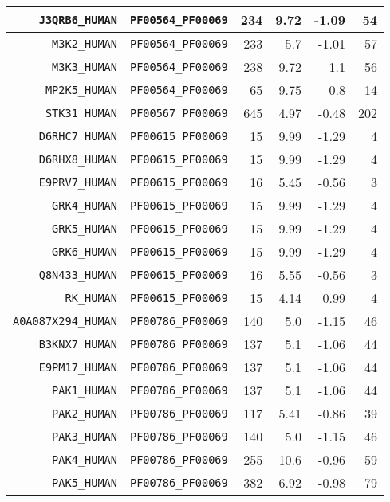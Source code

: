 \begin{longtable}[c]{||r|r|r|r|r|r||}
  \hline
  \texttt{J3QRB6\_HUMAN} & \texttt{PF00564\_PF00069} & 234 & 9.72 & -1.09 & 54 \\
  \hline
  \texttt{M3K2\_HUMAN} & \texttt{PF00564\_PF00069} & 233 & 5.7 & -1.01 & 57 \\
  \hline
  \texttt{M3K3\_HUMAN} & \texttt{PF00564\_PF00069} & 238 & 9.72 & -1.1 & 56 \\
  \hline
  \texttt{MP2K5\_HUMAN} & \texttt{PF00564\_PF00069} & 65 & 9.75 & -0.8 & 14 \\
  \hline
  \texttt{STK31\_HUMAN} & \texttt{PF00567\_PF00069} & 645 & 4.97 & -0.48 & 202 \\
  \hline
  \texttt{D6RHC7\_HUMAN} & \texttt{PF00615\_PF00069} & 15 & 9.99 & -1.29 & 4 \\
  \hline
  \texttt{D6RHX8\_HUMAN} & \texttt{PF00615\_PF00069} & 15 & 9.99 & -1.29 & 4 \\
  \hline
  \texttt{E9PRV7\_HUMAN} & \texttt{PF00615\_PF00069} & 16 & 5.45 & -0.56 & 3 \\
  \hline
  \texttt{GRK4\_HUMAN} & \texttt{PF00615\_PF00069} & 15 & 9.99 & -1.29 & 4 \\
  \hline
  \texttt{GRK5\_HUMAN} & \texttt{PF00615\_PF00069} & 15 & 9.99 & -1.29 & 4 \\
  \hline
  \texttt{GRK6\_HUMAN} & \texttt{PF00615\_PF00069} & 15 & 9.99 & -1.29 & 4 \\
  \hline
  \texttt{Q8N433\_HUMAN} & \texttt{PF00615\_PF00069} & 16 & 5.55 & -0.56 & 3 \\
  \hline
  \texttt{RK\_HUMAN} & \texttt{PF00615\_PF00069} & 15 & 4.14 & -0.99 & 4 \\
  \hline
  \texttt{A0A087X294\_HUMAN} & \texttt{PF00786\_PF00069} & 140 & 5.0 & -1.15 & 46 \\
  \hline
  \texttt{B3KNX7\_HUMAN} & \texttt{PF00786\_PF00069} & 137 & 5.1 & -1.06 & 44 \\
  \hline
  \texttt{E9PM17\_HUMAN} & \texttt{PF00786\_PF00069} & 137 & 5.1 & -1.06 & 44 \\
  \hline
  \texttt{PAK1\_HUMAN} & \texttt{PF00786\_PF00069} & 137 & 5.1 & -1.06 & 44 \\
  \hline
  \texttt{PAK2\_HUMAN} & \texttt{PF00786\_PF00069} & 117 & 5.41 & -0.86 & 39 \\
  \hline
  \texttt{PAK3\_HUMAN} & \texttt{PF00786\_PF00069} & 140 & 5.0 & -1.15 & 46 \\
  \hline
  \texttt{PAK4\_HUMAN} & \texttt{PF00786\_PF00069} & 255 & 10.6 & -0.96 & 59 \\
  \hline
  \texttt{PAK5\_HUMAN} & \texttt{PF00786\_PF00069} & 382 & 6.92 & -0.98 & 79 \\

\end{longtable}
